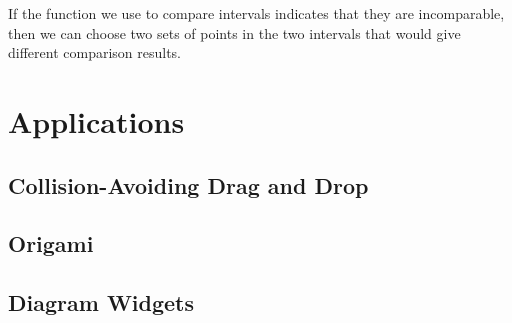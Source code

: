 \begin{lemma}
  \label{thm:compareComplete}
  \leanok
  If the function we use to compare intervals indicates that they are
  incomparable, then we can choose two sets of points in the two intervals that
  would give different comparison results.
\end{lemma}

\chapter{Applications}

\section{Collision-Avoiding Drag and Drop}

\section{Origami}

\section{Diagram Widgets}


